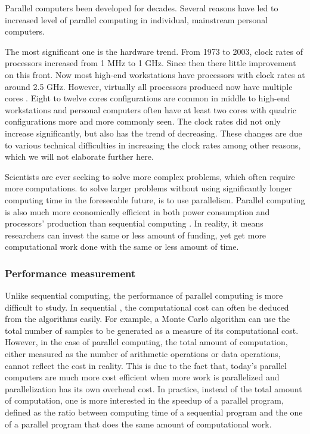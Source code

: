 Parallel computers  been developed for decades. Several reasons have led to  increased level of parallel computing in individual, mainstream personal computers.

The most significant one is the hardware trend. From 1973 to 2003, clock rates of processors increased from 1 MHz to 1 GHz. Since then there  little improvement on this front. Now most high-end workstations have processors with clock rates at around 2.5 GHz. However, virtually all processors produced now have multiple cores \cite{parallel}. Eight to twelve cores configurations are common in middle to high-end workstations and personal computers often have at least two cores with quadric configurations more and more commonly seen. The clock rates did not only increase significantly, but also has the trend of decreasing. These changes are due to various technical difficulties in increasing the clock rates among other reasons, which we will not elaborate further here.

Scientists are ever seeking to solve more complex problems, which often require more computations.  to solve larger problems without using significantly longer computing time in the foreseeable future, is to use parallelism. Parallel computing is also much more economically efficient in both power consumption and processors' production than sequential computing \cite{parallel}. In reality, it means researchers can invest the same or less amount of funding, yet get more computational work done with the same or less amount of time.

\subsubsection{Performance measurement}
\label{ssub:Performance measurement}

Unlike sequential computing, the performance of parallel computing is more difficult to study. In sequential , the computational cost can often be deduced from the algorithms easily. For example, a Monte Carlo algorithm can use the total number of samples to be generated as a measure of its computational cost. However, in the case of parallel computing, the total amount of computation, either measured as the number of arithmetic operations or data operations, cannot reflect the cost in reality. This is due to the fact that, today's parallel computers are much more cost efficient when more work is parallelized \cite{parallel} and parallelization has its own overhead cost. In practice, instead of the total amount of computation, one is more interested in the speedup of a parallel program, defined as the ratio between computing time of a sequential program and the one of a parallel program that does the same amount of computational work.

